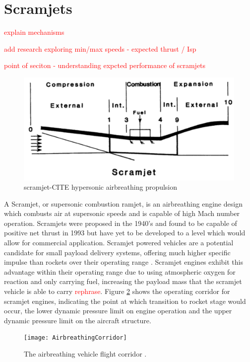 \section{Scramjets}



\textcolor{red}{explain mechanisms}

\textcolor{red}{add research exploring min/max speeds - expected thrust / Isp}

\textcolor{red}{point of seciton - understanding expcted performance of scramjets}



\begin{figure}
	\centering
	\includegraphics[width=0.7\linewidth]{figures/2_literature-review/scramjet}
	\caption{scramjet-CITE hypersonic airbreathing propulsion}
	\label{fig:scramjet}
\end{figure}



A Scramjet, or supersonic combustion ramjet, is an airbreathing engine design which combusts air at supersonic speeds and is capable of high Mach number operation. Scramjets were proposed in the 1940's \cite{Curran2001} and found to be capable of positive net thrust in 1993 \cite{Paull1993} but have yet to be developed to a level which would allow for commercial application. Scramjet powered vehicles are a potential candidate for small payload delivery systems, offering much higher specific impulse than rockets over their operating range \cite{Billig1993} \cite{Cook2003}. Scramjet engines exhibit this advantage within their operating range due to using atmospheric oxygen for reaction and only carrying fuel, increasing the payload mass that the scramjet vehicle is able to carry \textcolor{red}{rephrase}. Figure \ref{fig:AirbreathingCorridor} shows the operating corridor for scramjet engines, indicating the point at which transition to rocket stage would occur, the lower dynamic pressure limit on engine operation and the upper dynamic pressure limit on the aircraft structure.
\begin{figure}[ht]
	\centering
	\texttt{[image: AirbreathingCorridor]}
	\caption{The airbreathing vehicle flight corridor \cite{Smart2010}.}
	\label{fig:AirbreathingCorridor}
\end{figure}

